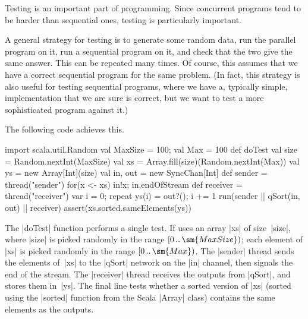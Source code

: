 
Testing is an important part of programming.  Since concurrent programs tend
to be harder than sequential ones, testing is particularly important.

A general strategy for testing is to generate some random data, run the
parallel program on it, run a sequential program on it, and check that the two
give the same answer.  This can be repeated many times.  Of course, this
assumes that we have a correct sequential program for the same problem.  (In
fact, this strategy is also useful for testing sequential programs, where we
have a, typically simple, implementation that we are sure is correct, but we
want to test a more sophisticated program against it.)


The following code achieves this.
%
\begin{scala}
  import scala.util.Random
  val MaxSize = 100; val Max = 100
  def doTest{
    val size = Random.nextInt(MaxSize)
    val xs = Array.fill(size)(Random.nextInt(Max))
    val ys = new Array[Int](size)
    val in, out = new SyncChan[Int]
    def sender = thread("sender"){ for(x <- xs) in!x; in.endOfStream }
    def receiver = thread("receiver"){ var i = 0; repeat{ ys(i) = out?(); i += 1 } }
    run(sender || qSort(in, out) || receiver)
    assert(xs.sorted.sameElements(ys))
  }
\end{scala}
%
The |doTest| function performs a single test.  If uses an array |xs| of
size~|size|, where |size| is picked randomly in the range
$\interval{0}{\sm{MaxSize}}$; each element of |xs| is picked randomly in the
range $\interval{0}{\sm{Max}}$.  The |sender| thread sends the elements
of~|xs| to the |qSort| network on the |in| channel, then signals the end of
the stream.  The |receiver| thread receives the outputs from |qSort|, and
stores them in~|ys|.  The final line tests whether a sorted version of |xs|
(sorted using the |sorted| function from the Scala |Array| class) contains the
same elements as the outputs.

